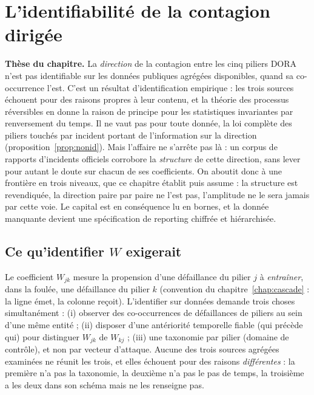 \chapter{L'identifiabilité de la contagion dirigée}
\label{ch:identifiabilite}

\begin{cle}
\textbf{Thèse du chapitre.} La \emph{direction} de la contagion entre les cinq piliers DORA
n'est pas identifiable sur les données publiques agrégées disponibles, quand sa co-occurrence
l'est. C'est un résultat d'identification empirique : les trois sources échouent pour des raisons
propres à leur contenu, et la théorie des processus réversibles en donne la raison de principe
pour les statistiques invariantes par renversement du temps. Il ne vaut pas pour toute donnée, la
loi complète des piliers touchés par incident portant de l'information sur la direction
(proposition~\ref{prop:nonid}). Mais l'affaire ne s'arrête pas là : un corpus de rapports
d'incidents officiels corrobore la \emph{structure} de cette direction, sans lever pour autant
le doute sur chacun de ses coefficients. On aboutit donc à une frontière en trois
niveaux, que ce chapitre établit puis assume : la structure est revendiquée, la direction paire
par paire ne l'est pas, l'amplitude ne le sera jamais par cette voie. Le capital est en
conséquence lu en bornes, et la donnée manquante devient une spécification de reporting
chiffrée et hiérarchisée.
\end{cle}

\section{Ce qu'identifier $W$ exigerait}

Le coefficient $W_{jk}$ mesure la propension d'une défaillance du pilier $j$ à
\emph{entraîner}, dans la foulée, une défaillance du pilier $k$ (convention
du chapitre~\ref{chap:cascade} : la ligne émet, la colonne reçoit). L'identifier sur données
demande trois choses simultanément : (i) observer des co-occurrences de défaillances de
piliers au sein d'une même entité ; (ii) disposer d'une antériorité temporelle fiable
(qui précède qui) pour distinguer $W_{jk}$ de $W_{kj}$ ; (iii) une taxonomie par pilier
(domaine de contrôle), et non par vecteur d'attaque. Aucune des trois sources agrégées examinées
ne réunit les trois, et elles échouent pour des raisons \emph{différentes} : la première n'a pas
la taxonomie, la deuxième n'a pas le pas de temps, la troisième a les deux dans son schéma mais
ne les renseigne pas.

